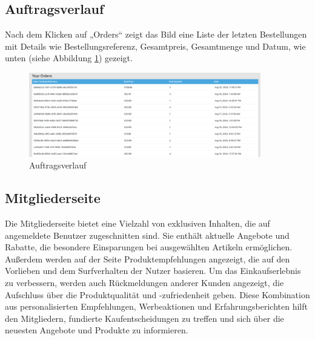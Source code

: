  \subsection{Auftragsverlauf}

Nach dem Klicken auf „Orders“ zeigt das Bild eine Liste der letzten Bestellungen mit Details wie Bestellungsreferenz, Gesamtpreis, Gesamtmenge und Datum, wie unten (siehe Abbildung \ref{fig:sample8-image}) gezeigt.


\begin{figure}[H]  
	\centering %
	\includegraphics[width=0.9\textwidth]{Images/Orders-History.png} 
	\caption{Auftragsverlauf} 
	\label{fig:sample8-image} 
\end{figure}

 \subsection{Mitgliederseite}

Die Mitgliederseite bietet eine Vielzahl von exklusiven Inhalten, die auf angemeldete Benutzer zugeschnitten sind. Sie enthält aktuelle Angebote und Rabatte, die besondere Einsparungen bei ausgewählten Artikeln ermöglichen. Außerdem werden auf der Seite Produktempfehlungen angezeigt, die auf den Vorlieben und dem Surfverhalten der Nutzer basieren. Um das Einkaufserlebnis zu verbessern, werden auch Rückmeldungen anderer Kunden angezeigt, die Aufschluss über die Produktqualität und -zufriedenheit geben. Diese Kombination aus personalisierten Empfehlungen, Werbeaktionen und Erfahrungsberichten hilft den Mitgliedern, fundierte Kaufentscheidungen zu treffen und sich über die neuesten Angebote und Produkte zu informieren.\\


